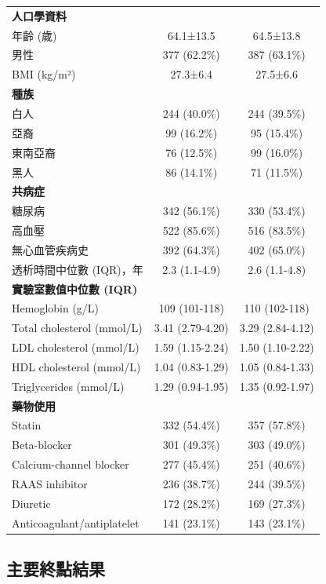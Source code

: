 \documentclass[12pt,a4paper]{article}
\begin{document}
\begin{longtable}{p{6cm}cc}
\multicolumn{3}{l}{\textbf{人口學資料}} \\
年齡 (歲) & 64.1±13.5 & 64.5±13.8 \\
男性 & 377 (62.2\%) & 387 (63.1\%) \\
BMI (kg/m²) & 27.3±6.4 & 27.5±6.6 \\
\midrule
\multicolumn{3}{l}{\textbf{種族}} \\
白人 & 244 (40.0\%) & 244 (39.5\%) \\
亞裔 & 99 (16.2\%) & 95 (15.4\%) \\
東南亞裔 & 76 (12.5\%) & 99 (16.0\%) \\
黑人 & 86 (14.1\%) & 71 (11.5\%) \\
\midrule
\multicolumn{3}{l}{\textbf{共病症}} \\
糖尿病 & 342 (56.1\%) & 330 (53.4\%) \\
高血壓 & 522 (85.6\%) & 516 (83.5\%) \\
無心血管疾病史 & 392 (64.3\%) & 402 (65.0\%) \\
\midrule
透析時間中位數 (IQR)，年 & 2.3 (1.1-4.9) & 2.6 (1.1-4.8) \\
\midrule
\multicolumn{3}{l}{\textbf{實驗室數值中位數 (IQR)}} \\
Hemoglobin (g/L) & 109 (101-118) & 110 (102-118) \\
Total cholesterol (mmol/L) & 3.41 (2.79-4.20) & 3.29 (2.84-4.12) \\
LDL cholesterol (mmol/L) & 1.59 (1.15-2.24) & 1.50 (1.10-2.22) \\
HDL cholesterol (mmol/L) & 1.04 (0.83-1.29) & 1.05 (0.84-1.33) \\
Triglycerides (mmol/L) & 1.29 (0.94-1.95) & 1.35 (0.92-1.97) \\
\midrule
\multicolumn{3}{l}{\textbf{藥物使用}} \\
Statin & 332 (54.4\%) & 357 (57.8\%) \\
Beta-blocker & 301 (49.3\%) & 303 (49.0\%) \\
Calcium-channel blocker & 277 (45.4\%) & 251 (40.6\%) \\
RAAS inhibitor & 236 (38.7\%) & 244 (39.5\%) \\
Diuretic & 172 (28.2\%) & 169 (27.3\%) \\
Anticoagulant/antiplatelet & 141 (23.1\%) & 143 (23.1\%) \\
\bottomrule
\end{longtable}

\subsection{主要終點結果}
\end{document}
